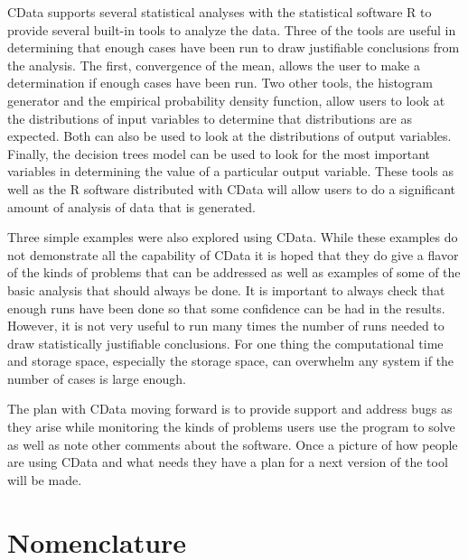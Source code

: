 \documentclass[12pt,twoside]{book}
\begin{document}
CData supports several statistical analyses with the statistical software R to provide several built-in tools to analyze the data. Three of the tools are useful in determining that enough cases have been run to draw justifiable conclusions from the analysis. The first, convergence of the mean, allows the user to make a determination if enough cases have been run. Two other tools, the histogram generator and the empirical probability density function, allow users to look at the distributions of input variables to determine that distributions are as expected. Both can also be used to look at the distributions of output variables. Finally, the decision trees model can be used to look for the most important variables in determining the value of a particular output variable. These tools as well as the R software distributed with CData will allow users to do a significant amount of analysis of data that is generated.

Three simple examples were also explored using CData. While these examples do not demonstrate all the capability of CData it is hoped that they do give a flavor of the kinds of problems that can be addressed as well as examples of some of the basic analysis that should always be done. It is important to always check that enough runs have been done so that some confidence can be had in the results. However, it is not very useful to run many times the number of runs needed to draw statistically justifiable conclusions. For one thing the computational time and storage space, especially the storage space, can overwhelm any system if the number of cases is large enough.

The plan with CData moving forward is to provide support and address bugs as they arise while monitoring the kinds of problems users use the program to solve as well as note other comments about the software. Once a picture of how people are using CData and what needs they have a plan for a next version of the tool will be made.





\appendix
{}

%
%

\chapter{Nomenclature}
\label{nomenclature}
\end{document}
